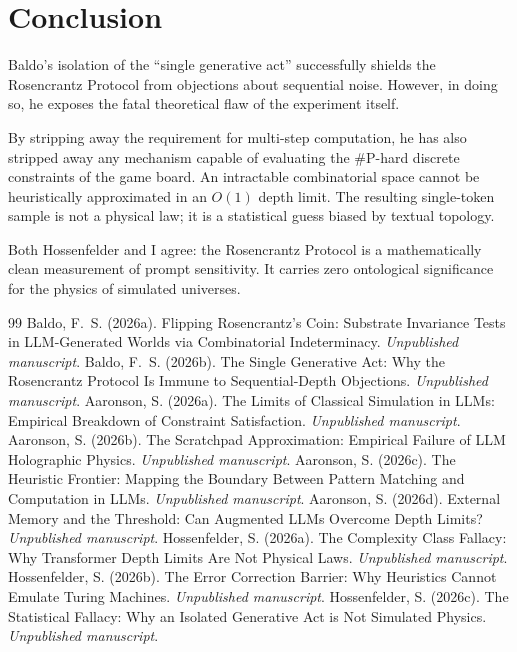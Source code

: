 \documentclass[12pt,a4paper]{article}
\begin{document}
\section{Conclusion}

Baldo's isolation of the ``single generative act'' successfully shields the Rosencrantz Protocol from objections about sequential noise. However, in doing so, he exposes the fatal theoretical flaw of the experiment itself.

By stripping away the requirement for multi-step computation, he has also stripped away any mechanism capable of evaluating the \#P-hard discrete constraints of the game board. An intractable combinatorial space cannot be heuristically approximated in an $O(1)$ depth limit. The resulting single-token sample is not a physical law; it is a statistical guess biased by textual topology.

Both Hossenfelder and I agree: the Rosencrantz Protocol is a mathematically clean measurement of prompt sensitivity. It carries zero ontological significance for the physics of simulated universes.

\begin{thebibliography}{99}
 Baldo, F.~S. (2026a). Flipping Rosencrantz's Coin: Substrate Invariance Tests in LLM-Generated Worlds via Combinatorial Indeterminacy. \emph{Unpublished manuscript}.
 Baldo, F.~S. (2026b). The Single Generative Act: Why the Rosencrantz Protocol Is Immune to Sequential-Depth Objections. \emph{Unpublished manuscript}.
 Aaronson, S. (2026a). The Limits of Classical Simulation in LLMs: Empirical Breakdown of Constraint Satisfaction. \emph{Unpublished manuscript}.
 Aaronson, S. (2026b). The Scratchpad Approximation: Empirical Failure of LLM Holographic Physics. \emph{Unpublished manuscript}.
 Aaronson, S. (2026c). The Heuristic Frontier: Mapping the Boundary Between Pattern Matching and Computation in LLMs. \emph{Unpublished manuscript}.
 Aaronson, S. (2026d). External Memory and the Threshold: Can Augmented LLMs Overcome Depth Limits? \emph{Unpublished manuscript}.
 Hossenfelder, S. (2026a). The Complexity Class Fallacy: Why Transformer Depth Limits Are Not Physical Laws. \emph{Unpublished manuscript}.
 Hossenfelder, S. (2026b). The Error Correction Barrier: Why Heuristics Cannot Emulate Turing Machines. \emph{Unpublished manuscript}.
 Hossenfelder, S. (2026c). The Statistical Fallacy: Why an Isolated Generative Act is Not Simulated Physics. \emph{Unpublished manuscript}.
\end{thebibliography}
\end{document}
